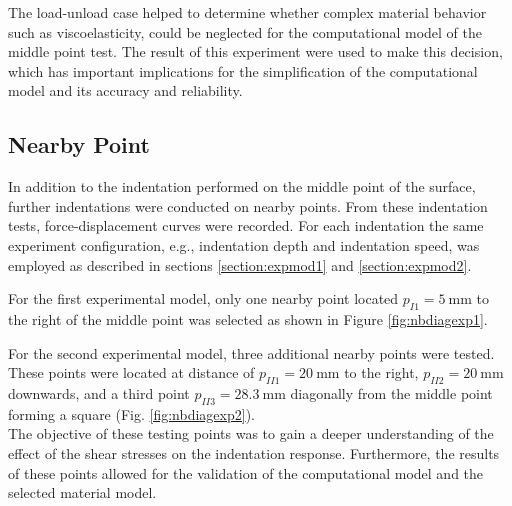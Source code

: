 The load-unload case helped to determine whether complex material behavior such as 
viscoelasticity, could be neglected for the computational model of the middle point test.
The result of this experiment were used to make this decision, which has important 
implications for the simplification of the computational model and its accuracy and reliability.

\subsection{Nearby Point}
\label{subsection:nearbypoint}
In addition to the indentation performed on the middle point of the surface, further 
indentations were conducted on nearby points. From these indentation tests, force-displacement 
curves were recorded. For each indentation the same experiment configuration, 
e.g., indentation depth and indentation 
speed, was employed as described in sections \ref{section:expmod1} and \ref{section:expmod2}.

For the first experimental model, only one nearby point located $p_{I1} = \SI{5}{\milli \m}$ 
to the right of the middle point was selected as shown in Figure \ref{fig:nbdiagexp1}.

For the second experimental model, three additional nearby points were tested. 
These points were located at distance of $p_{II1} = \SI{20}{\milli \m}$ to the 
right, $p_{II2} = \SI{20}{\milli \m}$ downwards, and a third point $p_{II3} = \SI{28.3}{\milli \m}$ 
diagonally from the middle point forming a square (Fig. \ref{fig:nbdiagexp2}). \\

The objective of these testing points was to gain a deeper understanding of the effect of 
the shear stresses on the indentation response. Furthermore, 
the results of these points allowed for the validation of the 
computational model and the selected material model.

